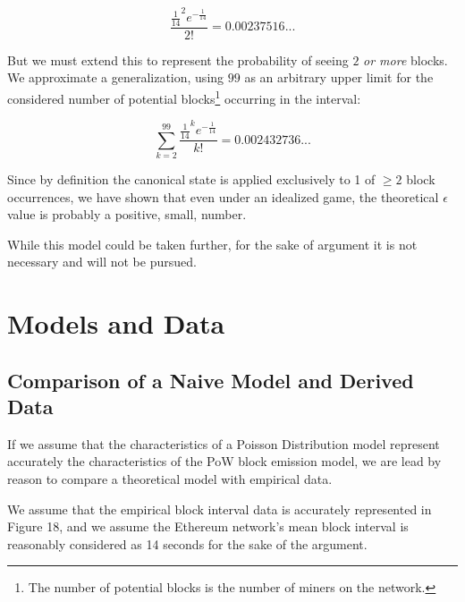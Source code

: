 \documentclass[11pt]{article}
\theoremstyle{plain}
\begin{document}
\begin{equation}
  \frac{\frac{1}{14}^{2}e^{-\frac{1}{14}}}{2!} = 0.00237516...
\end{equation}

But we must extend this to represent the probability of seeing $2$ \emph{or
more} blocks.
We approximate a generalization, using $99$ as an arbitrary upper limit for the
considered number of potential blocks\footnote{The number of potential blocks
is the number of miners on the network.} occurring in the interval:

\begin{equation}
  \sum_{k=2}^{99}\frac{\frac{1}{14}^{k}e^{-\frac{1}{14}}}{k!} = 0.002432736...
\end{equation}

Since by definition the canonical state is applied exclusively to 1 of
$\geq 2$ block occurrences, we have shown that even under an idealized game,
the theoretical $\epsilon$ value is probably a positive, small, number.

While this model could be taken further, for the sake of argument it is not
necessary and will not be pursued.

\section{\normalsize{Models and Data}}

\subsection{\normalsize{Comparison of a Naive Model and Derived Data}}

If we assume that the characteristics of a Poisson Distribution model represent
accurately the characteristics of the PoW block emission model,
we are lead by reason to compare a theoretical model with empirical data.

We assume that the empirical block interval data is accurately represented in
Figure 18,
and we assume the Ethereum network's mean block interval is reasonably
considered as 14 seconds for the sake of the argument.
\end{document}
